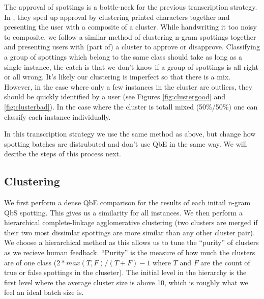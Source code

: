 \documentclass[ms,electronic,twosidetoc,letterpaper,chaptercenter,parttop,lof,lot]{byumsphd}
\begin{document}
The approval of spottings is a bottle-neck for the previous transcription strategy. In \cite{Retsinas2015}, they sped up approval by clustering printed characters together and presenting the user with a composite of a cluster. While handwriting it too noisy to composite, we follow a similar method of clustering n-gram spottings together and presenting users with (part of) a cluster to approve or disapprove. Classifying a group of spottings which belong to the same class should take as long as a single instance, the catch is that we don't know if a group of spottings is all right or all wrong. It's likely our clustering is imperfect so that there is a mix. However, in the case where only a few instances in the cluster are outliers, they should be quickly identified by a user (see Figures \ref{fig:clustergood} and \ref{fig:clusterbad}). In the case where the cluster is totall mixed (50\%/50\%) one can classify each instance individually.%

In this transcription strategy we use the same method as above, but change how spotting batches are distrubuted and don't use QbE in the same way. We will desribe the steps of this process next.

\subsection{Clustering}

We first perform a dense QbE comparison for the results of each initail n-gram QbS spotting. This gives us a similarity for all instances. We then perform a hierarchical complete-linkage agglomerative clustering (two clusters are merged if their two most dissimlar spottings are more similar than any other cluster pair). We choose a hierarchical method as this allows us to tune the ``purity'' of clusters as we recieve human feedback. ``Purity'' is the measure of how much the clusters are of one class ($2*max(T,F)/(T+F)-1$ where $T$ and $F$ are the count of true or false spottings in the cluseter). The initial level in the hierarchy is the first level where the average cluster size is above 10, which is roughly what we feel an ideal batch size is.
\end{document}
